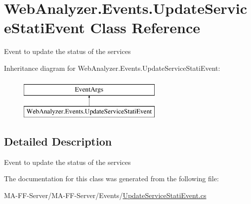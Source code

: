 \hypertarget{class_web_analyzer_1_1_events_1_1_update_service_stati_event}{}\section{Web\+Analyzer.\+Events.\+Update\+Service\+Stati\+Event Class Reference}
\label{class_web_analyzer_1_1_events_1_1_update_service_stati_event}


Event to update the status of the services  


Inheritance diagram for Web\+Analyzer.\+Events.\+Update\+Service\+Stati\+Event\+:\begin{figure}[H]
\begin{center}
\leavevmode
\includegraphics[height=2.000000cm]{class_web_analyzer_1_1_events_1_1_update_service_stati_event}
\end{center}
\end{figure}


\subsection{Detailed Description}
Event to update the status of the services 



The documentation for this class was generated from the following file\+:\begin{DoxyCompactItemize}
\item 
M\+A-\/\+F\+F-\/\+Server/\+M\+A-\/\+F\+F-\/\+Server/\+Events/\hyperlink{_update_service_stati_event_8cs}{Update\+Service\+Stati\+Event.\+cs}\end{DoxyCompactItemize}
